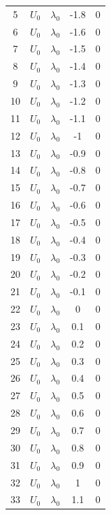 \documentclass[12pt,letterpaper]{scrreprt}
\begin{document}
\begin{appendices}
\begin{table}[!ht]
{\begin{tabular}{c|c|c|c|c}
5   & $U_0$        & $\lambda_0$ & -1.8  & 0   \\
6   & $U_0$        & $\lambda_0$ & -1.6  & 0   \\
7   & $U_0$        & $\lambda_0$ & -1.5  & 0   \\
8   & $U_0$        & $\lambda_0$ & -1.4  & 0   \\
9   & $U_0$        & $\lambda_0$ & -1.3  & 0   \\
10  & $U_0$        & $\lambda_0$ & -1.2  & 0   \\
11  & $U_0$        & $\lambda_0$ & -1.1  & 0   \\
12  & $U_0$        & $\lambda_0$ & -1    & 0   \\
13  & $U_0$        & $\lambda_0$ & -0.9  & 0   \\
14  & $U_0$        & $\lambda_0$ & -0.8  & 0   \\
15  & $U_0$        & $\lambda_0$ & -0.7  & 0   \\
16  & $U_0$        & $\lambda_0$ & -0.6  & 0   \\
17  & $U_0$        & $\lambda_0$ & -0.5  & 0   \\
18  & $U_0$        & $\lambda_0$ & -0.4  & 0   \\
19  & $U_0$        & $\lambda_0$ & -0.3  & 0   \\
20  & $U_0$        & $\lambda_0$ & -0.2  & 0   \\
21  & $U_0$        & $\lambda_0$ & -0.1  & 0   \\
22  & $U_0$        & $\lambda_0$ & 0     & 0   \\
23  & $U_0$        & $\lambda_0$ & 0.1   & 0   \\
24  & $U_0$        & $\lambda_0$ & 0.2   & 0   \\
25  & $U_0$        & $\lambda_0$ & 0.3   & 0   \\
26  & $U_0$        & $\lambda_0$ & 0.4   & 0   \\
27  & $U_0$        & $\lambda_0$ & 0.5   & 0   \\
28  & $U_0$        & $\lambda_0$ & 0.6   & 0   \\
29  & $U_0$        & $\lambda_0$ & 0.7   & 0   \\
30  & $U_0$        & $\lambda_0$ & 0.8   & 0   \\
31  & $U_0$        & $\lambda_0$ & 0.9   & 0   \\
32  & $U_0$        & $\lambda_0$ & 1     & 0   \\
33  & $U_0$        & $\lambda_0$ & 1.1   & 0   \\

\end{tabular}}
\end{table}
\end{appendices}
\end{document}
